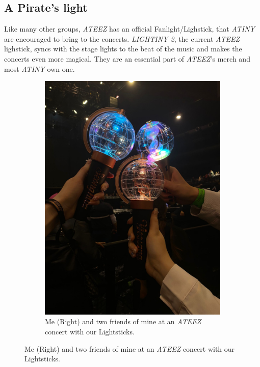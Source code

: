 \documentclass[a4paper,12pt]{article}
\begin{document}
\subsection{A Pirate's light}
Like many other groups, \textit{ATEEZ} has an official Fanlight/Lighstick, that \textit{ATINY} are encouraged to bring to the concerts. \textit{LIGHTINY 2}, the current \textit{ATEEZ} lighstick, syncs with the stage lights to the beat of the music and makes the concerts even more magical. They are an essential part of \textit{ATEEZ}'s merch and most \textit{ATINY} own one.\\

\begin{figure}[H]
  \begin{subfigure}[t]{0.3\textwidth}
    \includegraphics[width=\textwidth]{images/ateez_lighsticks.jpg}
    \caption{Me (Right) and two friends of mine at an \textit{ATEEZ} concert with our Lightsticks.}
    \label{fig:lightsticks_us}
  \end{subfigure}

\end{figure}
\end{document}
